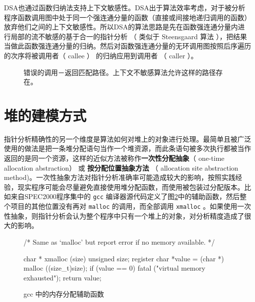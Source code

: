 DSA也通过函数归纳法支持上下文敏感性。DSA出于算法效率考虑，对于被分析程序函数调用图中处于同一个强连通分量的函数（直接或间接地递归调用的函数）放弃他们之间的上下文敏感性。所以DSA的算法思路是先在函数强连通分量内进行局部的流不敏感的基于合一的指针分析 （ 类似于 Steensgaard 算法 ），把结果当做此函数强连通分量的归纳。然后对函数强连通分量的无环调用图按照后序遍历的次序将被调用者（ callee ） 的归纳应用到调用者 （ caller ）。 

\begin{figure}
	\centering
	
	
	
	\caption{错误的调用－返回匹配路径。上下文不敏感算法允许这样的路径存在。}
	\label{fig:wrongPath}
\end{figure}


\section{堆的建模方式}
指针分析精确性的另一个维度是算法如何对堆上的对象进行处理。最简单且被广泛使用的做法是把一条堆分配语句当作一个堆资源，而此条语句被多次执行都被当作返回的是同一个资源，这样的近似方法被称作\textbf{一次性分配抽象}（ one-time allocation abstraction） 或 \textbf{按分配位置抽象方法} （ allocation site abstraction method)。一次性抽象方法对指针分析准确率可能造成较大的影响，按照实践经验，现实程序可能会尽量避免直接使用堆分配函数，而使用被包装过分配版本。比如来自SPEC2000程序集中的 \verb|gcc| 编译器源代码定义了图\ref{code:gcc}中的辅助函数，然后整个项目的其他位置没有再对 \verb|malloc| 的调用，而全部调用 \verb|xmalloc| 。如果使用一次性抽象，则指针分析会认为整个程序中只有一个堆上的对象，对分析精度造成了很大的影响。

\begin{figure}[htbp]
\begin{CVerbatim}
	/* Same as `malloc' but report error if no memory available.  */
	
	char *
	xmalloc (size)
	unsigned size;
	{
		register char *value = (char *) malloc ((size\_t)size);
		if (value == 0)
		fatal ("virtual memory exhausted");
		return value;
	}
\end{CVerbatim}	
\caption{ gcc 中的内存分配辅助函数}
\label{code:gcc}
\end{figure}

